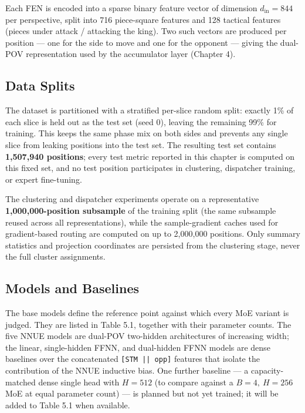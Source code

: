 Each FEN is encoded into a sparse binary feature vector of dimension $d_{\text{in}} = 844$ per perspective, split into 716 piece-square features and 128 tactical features (pieces under attack / attacking the king). Two such vectors are produced per position --- one for the side to move and one for the opponent --- giving the dual-POV representation used by the accumulator layer (Chapter 4).

\subsection{Data Splits}

The dataset is partitioned with a stratified per-slice random split: exactly 1\% of each slice is held out as the test set (seed 0), leaving the remaining 99\% for training. This keeps the same phase mix on both sides and prevents any single slice from leaking positions into the test set. The resulting test set contains \textbf{1,507,940 positions}; every test metric reported in this chapter is computed on this fixed set, and no test position participates in clustering, dispatcher training, or expert fine-tuning.

The clustering and dispatcher experiments operate on a representative \textbf{1,000,000-position subsample} of the training split (the same subsample reused across all representations), while the sample-gradient caches used for gradient-based routing are computed on up to 2,000,000 positions. Only summary statistics and projection coordinates are persisted from the clustering stage, never the full cluster assignments.

\subsection{Models and Baselines}

The base models define the reference point against which every MoE variant is judged. They are listed in Table 5.1, together with their parameter counts. The five NNUE models are dual-POV two-hidden architectures of increasing width; the linear, single-hidden FFNN, and dual-hidden FFNN models are dense baselines over the concatenated \texttt{[STM || opp]} features that isolate the contribution of the NNUE inductive bias. One further baseline --- a capacity-matched dense single head with $H{=}512$ (to compare against a $B{=}4,\ H{=}256$ MoE at equal parameter count) --- is planned but not yet trained; it will be added to Table 5.1 when available.

